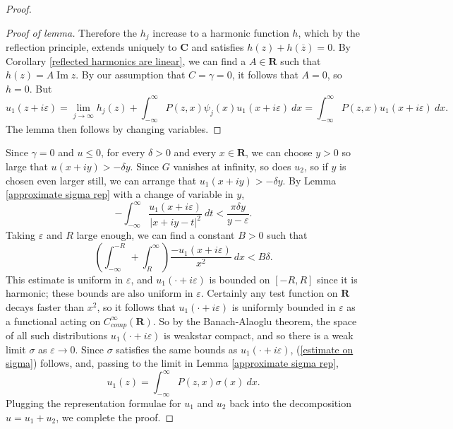 \documentclass[12pt]{report}
\newcommand{\RR}{\mathbf{R}}
\newcommand{\CC}{\mathbf{C}}
\renewcommand{\Im}{\operatorname{Im}}
\theoremstyle{definition}
\begin{document}
\begin{proof}
\begin{proof}[Proof of lemma]
    Therefore the $h_j$ increase to a harmonic function $h$, which by the reflection principle, extends uniquely to $\CC$ and satisfies $h(z) + h(\overline z) = 0$. By Corollary \ref{reflected harmonics are linear}, we can find a $A \in \RR$ such that $h(z) = A\Im z$. By our assumption that $C = \gamma = 0$, it follows that $A = 0$, so $h = 0$. But
    $$u_1(z + i\varepsilon) = \lim_{j \to \infty} h_j(z) + \int_{-\infty}^\infty P(z, x)\psi_j(x)u_1(x + i\varepsilon)~dx = \int_{-\infty}^\infty P(z, x)u_1(x + i\varepsilon) ~dx.$$
    The lemma then follows by changing variables.
\end{proof}
    Since $\gamma = 0$ and $u \leq 0$, for every $\delta > 0$ and every $x \in \RR$, we can choose $y > 0$ so large that $u(x + iy) > -\delta y$. Since $G$ vanishes at infinity, so does $u_2$, so if $y$ is chosen even larger still, we can arrange that $u_1(x + iy) > -\delta y$. By Lemma \ref{approximate sigma rep} with a change of variable in $y$,
$$-\int_{-\infty}^\infty \frac{u_1(x + i\varepsilon)}{|x + iy - t|^2} ~dt < \frac{\pi \delta y}{y - \varepsilon}.$$
    Taking $\varepsilon$ and $R$ large enough, we can find a constant $B > 0$ such that
$$\left(\int_{-\infty}^{-R} + \int_R^\infty\right) \frac{-u_1(x + i\varepsilon)}{x^2} ~dx < B \delta.$$
    This estimate is uniform in $\varepsilon$, and $u_1(\cdot + i\varepsilon)$ is bounded on $[-R, R]$ since it is harmonic; these bounds are also uniform in $\varepsilon$. Certainly any test function on $\RR$ decays faster than $x^2$, so it follows that $u_1(\cdot + i\varepsilon)$ is uniformly bounded in $\varepsilon$ as a functional acting on $C^\infty_{comp}(\RR)$. So by the Banach-Alaoglu theorem, the space of all such distributions $u_1(\cdot + i\varepsilon)$ is weakstar compact, and so there is a weak limit $\sigma$ as $\varepsilon \to 0$. Since $\sigma$ satisfies the same bounds as $u_1(\cdot + i\varepsilon)$, (\ref{estimate on sigma}) follows, and, passing to the limit in Lemma \ref{approximate sigma rep},
$$u_1(z) = \int_{-\infty}^\infty P(z, x) \sigma(x) ~dx.$$
    Plugging the representation formulae for $u_1$ and $u_2$ back into the decomposition $u = u_1 + u_2$, we complete the proof.
\end{proof}
\end{document}
